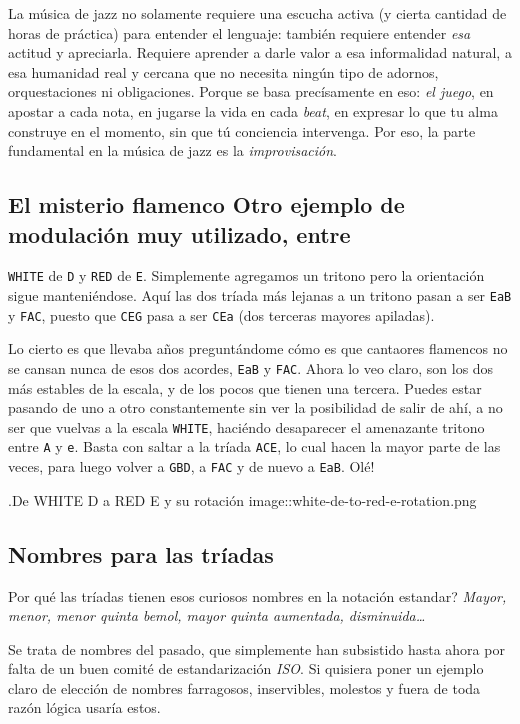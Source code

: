 \documentclass[]{article}
\begin{document}
La música de jazz no solamente requiere una escucha activa (y cierta cantidad de horas de práctica) para entender el lenguaje: también requiere entender \emph{esa} actitud y apreciarla. Requiere aprender a darle valor a esa informalidad natural, a esa humanidad real y cercana que no necesita ningún tipo de adornos, orquestaciones ni obligaciones. Porque se basa precísamente en eso: \emph{el juego}, en apostar a cada nota, en jugarse la vida en cada \emph{beat}, en expresar lo que tu alma construye en el momento, sin que tú conciencia intervenga. Por eso, la parte fundamental en la música de jazz es la \emph{improvisación}.

\subsection{El misterio flamenco Otro ejemplo de modulación muy utilizado, entre} \texttt{WHITE} de \texttt{D} y \texttt{RED} de \texttt{E}. Simplemente agregamos un tritono pero la orientación sigue manteniéndose. Aquí las dos tríada más lejanas a un tritono pasan a ser \texttt{EaB} y \texttt{FAC}, puesto que \texttt{CEG} pasa a ser \texttt{CEa} (dos terceras mayores apiladas).

Lo cierto es que llevaba años preguntándome cómo es que cantaores flamencos no se cansan nunca de esos dos acordes, \texttt{EaB} y \texttt{FAC}. Ahora lo veo claro, son los dos más estables de la escala, y de los pocos que tienen una tercera. Puedes estar pasando de uno a otro constantemente sin ver la posibilidad de salir de ahí, a no ser que vuelvas a la escala \texttt{WHITE}, haciéndo desaparecer el amenazante tritono entre \texttt{A} y \texttt{e}. Basta con saltar a la tríada \texttt{ACE}, lo cual hacen la mayor parte de las veces, para luego volver a \texttt{GBD}, a \texttt{FAC} y de nuevo a \texttt{EaB}. Olé!

.De WHITE D a RED E y su rotación image::white-de-to-red-e-rotation.png

 \subsection{Nombres para las tríadas}

Por qué las tríadas tienen esos curiosos nombres en la notación estandar? \emph{Mayor, menor, menor quinta bemol, mayor quinta   aumentada, disminuida\ldots{}}

Se trata de nombres del pasado, que simplemente han subsistido hasta ahora por falta de un buen comité de estandarización \emph{ISO}. Si quisiera poner un ejemplo claro de elección de nombres farragosos, inservibles, molestos y fuera de toda razón lógica usaría estos.
\end{document}
